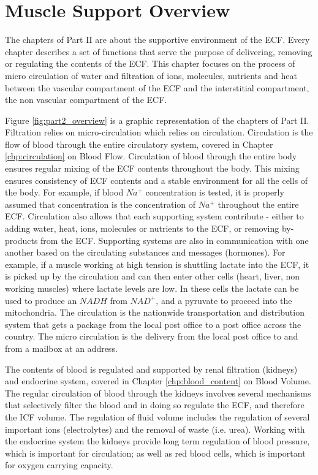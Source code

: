 \section{Muscle Support Overview}

The chapters of Part II are about the supportive environment of the ECF. Every chapter describes a set of functions that serve the purpose of delivering, removing or regulating the contents of the ECF. This chapter focuses on the process of micro circulation of water and filtration of ions, molecules, nutrients and heat between the  vascular compartment of the ECF and the interstitial compartment, the non vascular compartment of the ECF.  


Figure \ref{fig:part2_overview} is a graphic representation of the chapters of Part II. Filtration relies on micro-circulation which relies on circulation. Circulation is the flow of blood through the entire circulatory system, covered in Chapter \ref{chp:circulation} on Blood Flow. Circulation of blood through the entire body ensures regular mixing of the ECF contents throughout the body. This mixing ensures consistency of ECF contents and a stable environment for all the cells of the body. For example, if blood $Na^+$ concentration is tested, it is properly assumed that concentration is the concentration of $Na^+$ throughout the entire ECF. Circulation also allows that each supporting system contribute - either to adding water, heat, ions, molecules or nutrients to the ECF, or removing by-products from the ECF. Supporting systems are also in communication with one another based on the circulating substances and messages (hormones). For example, if a muscle working at high tension is shuttling lactate into the ECF, it is picked up by the circulation and can then enter other cells (heart, liver, non working muscles) where lactate levels are low. In these cells the lactate can be used to produce an $NADH$ from $NAD^+$, and a pyruvate to proceed into the mitochondria. The circulation is the nationwide transportation and distribution system that gets a package from the local post office to a post office across the country. The micro circulation is the delivery from the local post office to and from a mailbox at an address.

The contents of blood is regulated and supported by renal filtration (kidneys) and endocrine system, covered in Chapter \ref{chp:blood_content} on Blood Volume. The regular circulation of blood through the kidneys involves several mechanisms that selectively filter the blood and in doing so regulate the ECF, and therefore the ICF volume. The regulation of fluid volume includes the regulation of several important ions (electrolytes) and the removal of waste (i.e. urea). Working with the endocrine system the kidneys provide long term regulation of blood pressure, which is important for circulation; as well as red blood cells, which is important for oxygen carrying capacity.

